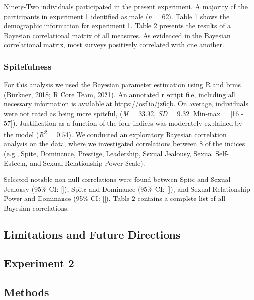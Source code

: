 \documentclass[
  donotrepeattitle,doc, 12pt, a4paper,floatsintext]{apa7}
\begin{document}
Ninety-Two individuals participated in the present experiment. A majority of the participants in experiment 1 identified as male (\emph{n} = 62). Table 1 shows the demographic information for experiment 1. Table 2 presents the results of a Bayesian correlational matrix of all measures. As evidenced in the Bayesian correlational matrix, most surveys positively correlated with one another.

\hypertarget{spitefulness}{%
\subsubsection{Spitefulness}\label{spitefulness}}

For this analysis we used the Bayesian parameter estimation using R and brms (\protect\hyperlink{ref-burkner2018}{Bürkner, 2018}; \protect\hyperlink{ref-rcoreteam2021}{R Core Team, 2021}). An annotated r script file, including all necessary information is available at \url{https://osf.io/jz6qb}. On average, individuals were not rated as being more spiteful, (\emph{M} = 33.92, \emph{SD} = 9.32, Min-max = {[}16 - 57{]}). Justification as a function of the four indices was moderately explained by the model (\emph{R\textsuperscript{2}} = 0.54). We conducted an exploratory Bayesian correlation analysis on the data, where we investigated correlations between 8 of the indices (e.g., Spite, Dominance, Prestige, Leadership, Sexual Jealousy, Sexual Self-Esteem, and Sexual Relationship Power Scale).

Selected notable non-null correlations were found between Spite and Sexual Jealousy (95\% CI: {[}{]}), Spite and Dominance (95\% CI: {[}{]}), and Sexual Relationship Power and Dominance (95\% CI: {[}{]}). Table 2 contains a complete list of all Bayesian correlations.

\hypertarget{limitations-and-future-directions}{%
\subsection{Limitations and Future Directions}\label{limitations-and-future-directions}}

\hypertarget{experiment-2}{%
\subsection{Experiment 2}\label{experiment-2}}

\hypertarget{methods}{%
\subsection{Methods}\label{methods}}
\end{document}
